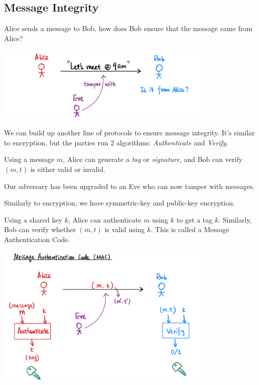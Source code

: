 \subsection{Message Integrity}
Alice sends a message to Bob, how does Bob ensure that the message came from Alice?

\begin{center}
    \includegraphics[width=0.8\textwidth]{images/2023-02-02/integrity.png}
\end{center}

We can build up another line of protocols to ensure message integrity. It's similar to encryption, but the parties run 2 algorithms: \emph{Authenticate} and \emph{Verify}.

Using a message $m$, Alice can generate a \emph{tag} or \emph{signature}, and Bob can verify $(m, t)$ is either valid or invalid.

Our adversary has been upgraded to an Eve who can now tamper with messages.

Similarly to encryption, we have symmetric-key and public-key encryption.

Using a shared key $k$, Alice can authenticate $m$ using $k$ to get a tag $k$. Similarly, Bob can verify whether $(m, t)$ is valid using $k$. This is called a Message Authentication Code.

\begin{center}
    \includegraphics[width=0.8\textwidth]{images/2023-02-02/mac.png}
\end{center}

